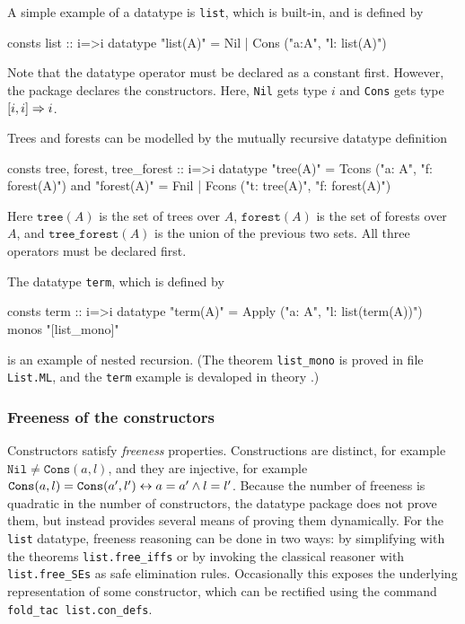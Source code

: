 A simple example of a datatype is \texttt{list}, which is built-in, and is
defined by
\begin{ttbox}
consts     list :: i=>i
datatype  "list(A)" = Nil | Cons ("a:A", "l: list(A)")
\end{ttbox}
Note that the datatype operator must be declared as a constant first.
However, the package declares the constructors.  Here, \texttt{Nil} gets type
$i$ and \texttt{Cons} gets type $[i,i]\Rightarrow i$.

Trees and forests can be modelled by the mutually recursive datatype
definition
\begin{ttbox}
consts     tree, forest, tree_forest :: i=>i
datatype  "tree(A)"   = Tcons ("a: A",  "f: forest(A)")
and       "forest(A)" = Fnil  |  Fcons ("t: tree(A)",  "f: forest(A)")
\end{ttbox}
Here $\texttt{tree}(A)$ is the set of trees over $A$, $\texttt{forest}(A)$ is
the set of forests over $A$, and  $\texttt{tree_forest}(A)$ is the union of
the previous two sets.  All three operators must be declared first.

The datatype \texttt{term}, which is defined by
\begin{ttbox}
consts     term :: i=>i
datatype  "term(A)" = Apply ("a: A", "l: list(term(A))")
  monos "[list_mono]"
\end{ttbox}
is an example of nested recursion.  (The theorem \texttt{list_mono} is proved
in file \texttt{List.ML}, and the \texttt{term} example is devaloped in theory
.)

\subsubsection{Freeness of the constructors}

Constructors satisfy {\em freeness} properties.  Constructions are distinct,
for example $\texttt{Nil}\not=\texttt{Cons}(a,l)$, and they are injective, for
example $\texttt{Cons}(a,l)=\texttt{Cons}(a',l') \leftrightarrow a=a' \wedge l=l'$.
Because the number of freeness is quadratic in the number of constructors, the
datatype package does not prove them, but instead provides several means of
proving them dynamically.  For the \texttt{list} datatype, freeness reasoning
can be done in two ways: by simplifying with the theorems
\texttt{list.free_iffs} or by invoking the classical reasoner with
\texttt{list.free_SEs} as safe elimination rules.  Occasionally this exposes
the underlying representation of some constructor, which can be rectified
using the command \hbox{\tt fold_tac list.con_defs}.

